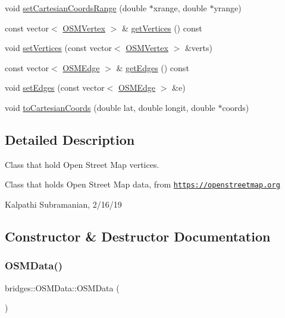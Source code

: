 \begin{DoxyCompactItemize}
void \mbox{\hyperlink{classbridges_1_1_o_s_m_data_ab61b84e459e01baa7f2c00da47ff4ccf}{set\+Cartesian\+Coords\+Range}} (double $\ast$xrange, double $\ast$yrange)
\item 
const vector$<$ \mbox{\hyperlink{classbridges_1_1_o_s_m_vertex}{O\+S\+M\+Vertex}} $>$ \& \mbox{\hyperlink{classbridges_1_1_o_s_m_data_a2f8fd5e4d3d0252ae7afae32f9ccc4fa}{get\+Vertices}} () const
\item 
void \mbox{\hyperlink{classbridges_1_1_o_s_m_data_aafb30f3266813b4ad8526312d4914f91}{set\+Vertices}} (const vector$<$ \mbox{\hyperlink{classbridges_1_1_o_s_m_vertex}{O\+S\+M\+Vertex}} $>$ \&verts)
\item 
const vector$<$ \mbox{\hyperlink{classbridges_1_1_o_s_m_edge}{O\+S\+M\+Edge}} $>$ \& \mbox{\hyperlink{classbridges_1_1_o_s_m_data_a0a226c840f69547f5d4e53dd7d4ef5d3}{get\+Edges}} () const
\item 
void \mbox{\hyperlink{classbridges_1_1_o_s_m_data_a3448ae401b5c5253262cc9c386dba1a9}{set\+Edges}} (const vector$<$ \mbox{\hyperlink{classbridges_1_1_o_s_m_edge}{O\+S\+M\+Edge}} $>$ \&e)
\item 
void \mbox{\hyperlink{classbridges_1_1_o_s_m_data_a30f6f5c0f20660fdb903bfe6fef4d4e0}{to\+Cartesian\+Coords}} (double lat, double longit, double $\ast$coords)
\end{DoxyCompactItemize}


\subsection{Detailed Description}
Class that hold Open Street Map vertices. 

Class that holds Open Street Map data, from \href{https://openstreetmap.org}{\tt https\+://openstreetmap.\+org}

Kalpathi Subramanian, 2/16/19 

\subsection{Constructor \& Destructor Documentation}
\mbox{\label{classbridges_1_1_o_s_m_data_a8abc19a052659621f74d7cbe354f90e9}} 
\subsubsection{\texorpdfstring{O\+S\+M\+Data()}{OSMData()}}
{\footnotesize\ttfamily bridges\+::\+O\+S\+M\+Data\+::\+O\+S\+M\+Data (\begin{DoxyParamCaption}{ }\end{DoxyParamCaption})\hspace{0.3cm}{\ttfamily [inline]}}



